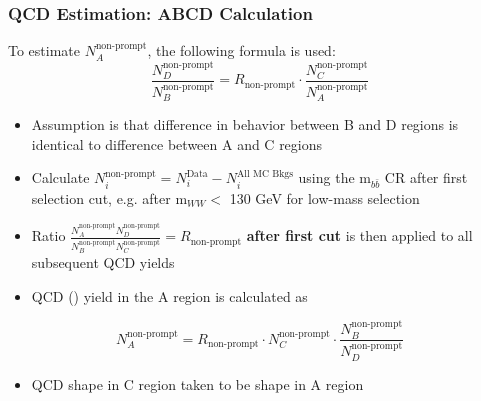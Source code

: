 \documentclass{beamer}
\newcommand*{\mww}{\ensuremath{\text{m}_{WW}}\xspace}
\newcommand*{\mbb}{\ensuremath{\text{m}_{b\bar{b}}}\xspace}
\begin{document}
{  \begin{frame}
    \frametitle{QCD Estimation: ABCD Calculation} \small
    To estimate $N_A^{\text{non-prompt}}$, the following formula is used:
    \begin{equation*}
      \frac{N_D^{\text{non-prompt}}}{N_B^{\text{non-prompt}}} = R_{\text{non-prompt}} \cdot \frac{N_C^{\text{non-prompt}}}{N_A^{\text{non-prompt}}} 
    \end{equation*}
    \vspace{-10pt}
    \begin{itemize}
    \item Assumption is that difference in behavior between B and D regions is identical to difference between A and C regions
    \item Calculate $N_i^{\text{non-prompt}} = N_i^{\text{Data}} - N_i^{\text{All MC Bkgs}}$ using the \mbb CR after first selection cut, e.g. after \mww $<$ 130 GeV for low-mass selection
    \item Ratio $\frac{N_A^{\text{non-prompt}}N_D^{\text{non-prompt}}}{N_B^{\text{non-prompt}}N_C^{\text{non-prompt}}} = R_{\text{non-prompt}}$ \textbf{after first cut} is then applied to all subsequent QCD yields
    \item QCD () yield in the A region is calculated as 
    \end{itemize}
    \vspace{-5pt}
    \begin{equation*}
      N_A^{\text{non-prompt}} = R_{\text{non-prompt}} \cdot {N_C^{\text{non-prompt}}} \cdot \frac{N_B^{\text{non-prompt}}}{N_D^{\text{non-prompt}}} 
    \end{equation*}
    \vspace{-15pt}
    \begin{itemize}
    \item QCD shape in C region taken to be shape in A region
    \end{itemize}
  \end{frame}
  

}
\end{document}
